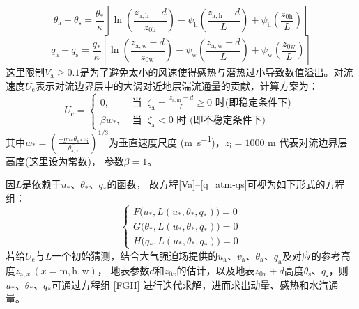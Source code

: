 %
\begin{equation}\label{theta_atm-theta_s}
  \theta_{\mathrm{a}}-\theta_{\mathrm{s}}=\frac{\theta_{\mathrm{*}}}{\kappa}\left[\ln \left(\frac{z_{\mathrm{a, h}}-d}{z_{\mathrm{0 h}}}\right)-\psi_{\mathrm{h}}\left(\frac{z_{\mathrm{a, h}}-d}{L}\right)+\psi_{\mathrm{h}}\left(\frac{z_{\mathrm{0 h}}}{L}\right)\right]
\end{equation}
%
\begin{equation}\label{q_atm-qs}
  q_{\mathrm{a}}-q_{\mathrm{s}}=\frac{q_{*}}{\kappa}\left[\ln \left(\frac{z_{\mathrm{a, w}}-d}{z_{\mathrm{0 w}}}\right)-\psi_{\mathrm{w}}\left(\frac{z_{\mathrm{a, w}}-d}{L}\right)+\psi_{\mathrm{w}}\left(\frac{z_{\mathrm{0 w}}}{L}\right)\right]
\end{equation}
这里限制$V_{\mathrm {a}}\geqslant0.1$是为了避免太小的风速使得感热与潜热过小导致数值溢出。对流速度$U_{\mathrm {c}}$表示对流边界层中的大涡对近地层湍流通量的贡献，计算方案为：
\begin{equation}
  U_{\mathrm{c}}= \begin{cases}
    0, & \text { 当 }\ \zeta_{\mathrm{a}}=\frac{z_{\mathrm{a, m}}-d}{L} \geqslant 0 \text { 时(即稳定条件下) } \\
    \beta w_{*}, & \text { 当 }\ \zeta_{\mathrm{a}}<0 \text { 时 (即不稳定条件下) }
  \end{cases}
\end{equation}
其中$w_\ast={(\frac{-gu_\ast\theta_{\mathrm{v\ast}}z_{\mathrm {i}}}{\overline{\theta_{\mathrm{a,v}}}})}^{1/3}$为垂直速度尺度 (\unit{m.s^{-1}})，$z_{\mathrm {i}}=1000$ m 代表对流边界层高度(这里设为常数)，
参数$\beta=1$。

因$L$是依赖于$u_\ast$、$\theta_\ast$、$q_\ast$的函数，
故方程\eqref{Va}--\eqref{q_atm-qs}可视为如下形式的方程组：
\begin{equation}\label{FGH}
  \left\{\begin{array}{l}F\big(u_{*}, L\left(u_{*}, \theta_{*}, q_{*}\right)\big)=0 \\
      G\big(\theta_{*}, L\left(u_{*}, \theta_{*}, q_{*}\right)\big)=0 \\
  H\big(q_{*}, L\left(u_{*}, \theta_{*}, q_{*}\right)\big)=0\end{array}\right.
\end{equation}
若给$U_{\mathrm {c}}$与$L$一个初始猜测，结合大气强迫场提供的$u_{\mathrm{a}}$、$v_{\mathrm{a}}$、$\theta_{\mathrm{a}}$、$q_{\mathrm{a}}$及对应的参考高度$z_{\mathrm{a},x}\, (x=\mathrm{m,h,w})$，
地表参数$d$和$z_{0x}$的估计，以及地表$z_{0x}+d$高度$\theta_{\mathrm {s}}$、$q_{\mathrm {s}}$，则$u_\ast$、$\theta_\ast$、$q_\ast$可通过方程组
\eqref{FGH}
进行迭代求解，进而求出动量、感热和水汽通量。

